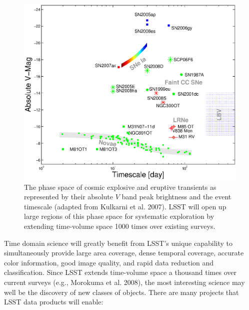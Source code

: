 \documentclass{emulateapj}
\begin{document}
\begin{figure}
\hskip -0.1in
\vskip -0.1in
\includegraphics[width=1.1\hsize,clip]{shri2.ps}
\vskip -0.1in
\caption{The phase space of cosmic explosive and eruptive transients as
represented by their absolute $V$ band peak brightness and the 
event timescale (adapted from Kulkarni et al. 2007). LSST will open up large 
regions of this phase space for systematic exploration by extending
time-volume space 1000 times over existing surveys.} 
\label{Fig:shri}
\end{figure}



Time domain science will greatly benefit from LSST's unique capability to simultaneously
provide large area coverage, dense temporal coverage, accurate color information,
good image quality, and rapid data reduction and classification. Since LSST extends 
time-volume space a thousand times over current surveys (e.g., Morokuma et al. 2008), 
the most interesting science may well be the discovery of new classes of objects.  
There are many projects that LSST data products will enable:
\end{document}
